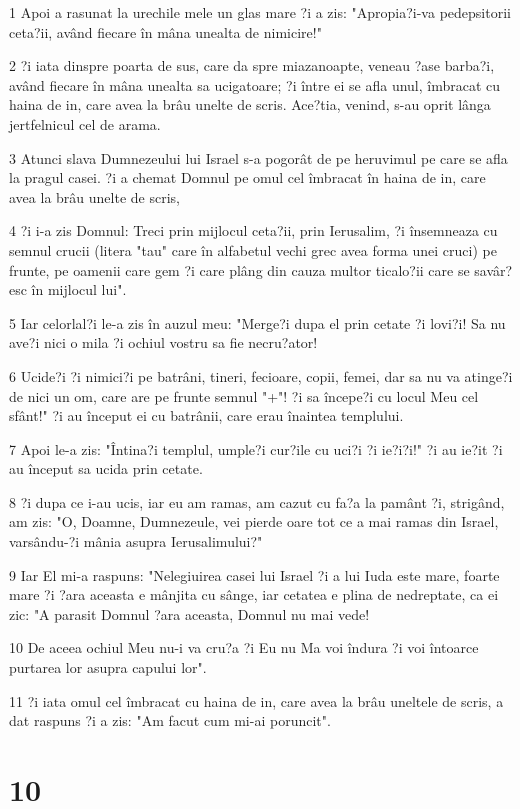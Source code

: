 \par 1 Apoi a rasunat la urechile mele un glas mare ?i a zis: "Apropia?i-va pedepsitorii ceta?ii, având fiecare în mâna unealta de nimicire!"
\par 2 ?i iata dinspre poarta de sus, care da spre miazanoapte, veneau ?ase barba?i, având fiecare în mâna unealta sa ucigatoare; ?i între ei se afla unul, îmbracat cu haina de in, care avea la brâu unelte de scris. Ace?tia, venind, s-au oprit lânga jertfelnicul cel de arama.
\par 3 Atunci slava Dumnezeului lui Israel s-a pogorât de pe heruvimul pe care se afla la pragul casei. ?i a chemat Domnul pe omul cel îmbracat în haina de in, care avea la brâu unelte de scris,
\par 4 ?i i-a zis Domnul: Treci prin mijlocul ceta?ii, prin Ierusalim, ?i însemneaza cu semnul crucii (litera "tau" care în alfabetul vechi grec avea forma unei cruci) pe frunte, pe oamenii care gem ?i care plâng din cauza multor ticalo?ii care se savâr?esc în mijlocul lui".
\par 5 Iar celorlal?i le-a zis în auzul meu: "Merge?i dupa el prin cetate ?i lovi?i! Sa nu ave?i nici o mila ?i ochiul vostru sa fie necru?ator!
\par 6 Ucide?i ?i nimici?i pe batrâni, tineri, fecioare, copii, femei, dar sa nu va atinge?i de nici un om, care are pe frunte semnul "+"! ?i sa începe?i cu locul Meu cel sfânt!" ?i au început ei cu batrânii, care erau înaintea templului.
\par 7 Apoi le-a zis: "Întina?i templul, umple?i cur?ile cu uci?i ?i ie?i?i!" ?i au ie?it ?i au început sa ucida prin cetate.
\par 8 ?i dupa ce i-au ucis, iar eu am ramas, am cazut cu fa?a la pamânt ?i, strigând, am zis: "O, Doamne, Dumnezeule, vei pierde oare tot ce a mai ramas din Israel, varsându-?i mânia asupra Ierusalimului?"
\par 9 Iar El mi-a raspuns: "Nelegiuirea casei lui Israel ?i a lui Iuda este mare, foarte mare ?i ?ara aceasta e mânjita cu sânge, iar cetatea e plina de nedreptate, ca ei zic: "A parasit Domnul ?ara aceasta, Domnul nu mai vede!
\par 10 De aceea ochiul Meu nu-i va cru?a ?i Eu nu Ma voi îndura ?i voi întoarce purtarea lor asupra capului lor".
\par 11 ?i iata omul cel îmbracat cu haina de in, care avea la brâu uneltele de scris, a dat raspuns ?i a zis: "Am facut cum mi-ai poruncit".

\chapter{10}

